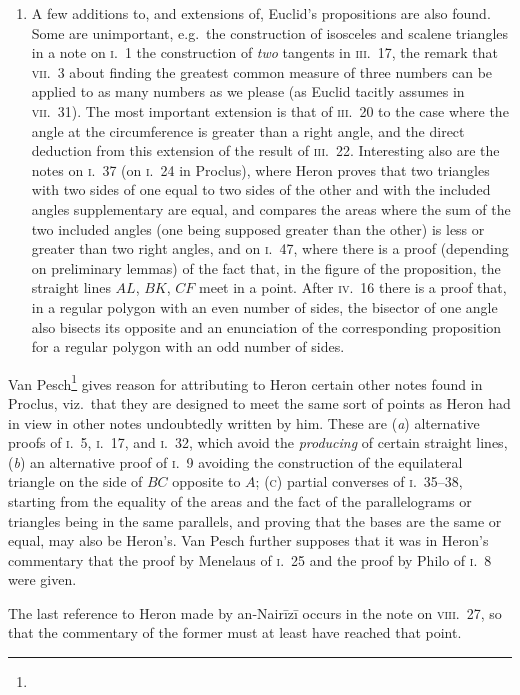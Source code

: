 \begin{enumerate}[label=(\arabic*)]
	\item A few additions to, and extensions of, Euclid's propositions are also found. Some are unimportant, e.g.\ the construction of isosceles and scalene triangles in a note on \textsc{i}.~1 the construction of \emph{two} tangents in \textsc{iii}.~17, the remark that \textsc{vii}.~3 about finding the greatest common measure of three numbers can be applied to as many numbers as we please (as Euclid tacitly assumes in \textsc{vii}.~31). The most important extension is that of \textsc{iii}.~20 to the case where the angle at the circumference is greater than a right angle, and the direct deduction from this extension of the result of \textsc{iii}.~22. Interesting also are the notes on \textsc{i}.~37 (on \textsc{i}.~24 in Proclus), where Heron proves that two triangles with two sides of one equal to two sides of the other and with the included angles supplementary are equal, and compares the areas where the sum of the two included angles (one being supposed greater than the other) is less or greater than two right angles, and on \textsc{i}.~47, where there is a proof (depending on preliminary lemmas) of the fact that, in the figure of the proposition, the straight lines \(AL\), \(BK\), \(CF\) meet in a point. After \textsc{iv}.~16 there is a proof that, in a regular polygon with an even number of sides, the bisector of one angle also bisects its opposite and an enunciation of the corresponding proposition for a regular polygon with an odd number of sides.
\end{enumerate}

Van Pesch\footnote{} gives reason for attributing to Heron certain other notes found in Proclus, viz.\ that they are designed to meet the same sort of points as Heron had in view in other notes undoubtedly written by him. These are (\emph{a}) alternative proofs of \textsc{i}.~5, \textsc{i}.~17, and \textsc{i}.~32, which avoid the \emph{producing} of certain straight lines, (\emph{b}) an alternative proof of \textsc{i}.~9 avoiding the construction of the equilateral triangle on the side of \(BC\) opposite to \(A\); (\textsc{c}) partial converses of \textsc{i}.~35--38, starting from the equality of the areas and the fact of the parallelograms or triangles being in the same parallels, and proving that the bases are the same or equal, may also be Heron's. Van Pesch further supposes that it was in Heron's commentary that the proof by Menelaus of \textsc{i}.~25 and the proof by Philo of \textsc{i}.~8 were given.

The last reference to Heron made by an-Nairīzī occurs in the note on \textsc{viii}.~27, so that the commentary of the former must at least have reached that point.

